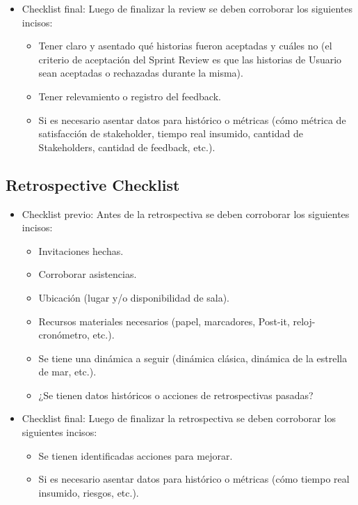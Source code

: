 \begin{itemize}
{\begin{itemize}
  \end{itemize}
  }
  
  \item {Checklist final: Luego de finalizar la review se deben corroborar los siguientes incisos:
    \begin{itemize}
      \item Tener claro y asentado qué historias fueron aceptadas y cuáles no (el criterio de aceptación del Sprint Review es que las historias de Usuario sean aceptadas o rechazadas durante la misma).
      \item Tener relevamiento o registro del feedback.
      \item Si es necesario asentar datos para histórico o métricas (cómo métrica de satisfacción de stakeholder, tiempo real insumido, cantidad de Stakeholders, cantidad de feedback, etc.).
   \end{itemize}
  }

\end{itemize}

\subsection{Retrospective Checklist}

\begin{itemize}
  
  \item {Checklist previo: Antes de la retrospectiva se deben corroborar los siguientes incisos:
  
  \begin{itemize}
    \item Invitaciones hechas.
    \item Corroborar asistencias.
    \item Ubicación (lugar y/o disponibilidad de sala).
    \item Recursos materiales necesarios (papel, marcadores, Post-it, reloj-cronómetro, etc.).
    \item Se tiene una dinámica a seguir (dinámica clásica, dinámica de la estrella de mar, etc.).
    \item ¿Se tienen datos históricos o acciones de retrospectivas pasadas?

  \end{itemize}
  }
  
  \item {Checklist final: Luego de finalizar la retrospectiva se deben corroborar los siguientes incisos:
    \begin{itemize}
      \item Se tienen identificadas acciones para mejorar.
      \item Si es necesario asentar datos para histórico o métricas (cómo tiempo real insumido, riesgos, etc.).
   \end{itemize}
  }

\end{itemize}
